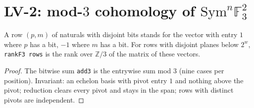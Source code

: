 \section{LV-2: mod-$3$ cohomology of $\mathrm{Sym}^n\mathbb F_3^2$}

\begin{theorem}\label{thm:lv3-rankf3}
  \leanok
  A row $(p,m)$ of naturals with disjoint bits stands for the vector with entry $1$ where $p$ has a bit, $-1$ where $m$ has a bit.
  For rows with disjoint planes below $2^w$, \texttt{rankF3 rows} is the rank over $\mathbb Z/3$ of the matrix of these vectors.
\end{theorem}
\begin{proof}
  \leanok
  The bitwise sum \texttt{add3} is the entrywise sum mod $3$ (nine cases per position).  Invariant: an echelon basis with pivot
  entry $1$ and nothing above the pivot; reduction clears every pivot and stays in the span; rows with distinct pivots are
  independent.
\end{proof}

